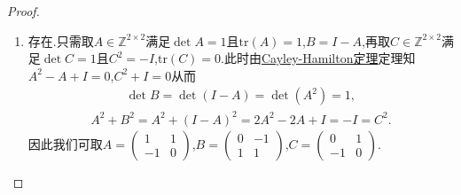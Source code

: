 \documentclass[../../main.tex]{subfiles}
\begin{document}
\begin{proof}
\begin{enumerate}[(1)]
\item 存在.只需取$A\in \mathbb{Z}^{2 \times 2}$满足$\det A = 1$且$\mathrm{tr}(A) = 1$,$B = I - A$,再取$C\in \mathbb{Z}^{2 \times 2}$满足$\det C = 1$且$C^2 = -I$,$\mathrm{tr}(C) = 0$.此时由\hyperref[theorem:Cayley-Hamilton定理]{Cayley-Hamilton定理}定理知$A^2 - A + I = 0$,$C^2 + I = 0$从而
\begin{align*}
\det B = \det(I - A) = \det(A^2) = 1,
\end{align*}
\begin{align*}
A^2 + B^2 = A^2 + (I - A)^2 = 2A^2 - 2A + I = -I = C^2.
\end{align*}
因此我们可取$A = \begin{pmatrix} 1 & 1 \\ -1 & 0 \end{pmatrix}$,$B = \begin{pmatrix} 0 & -1 \\ 1 & 1 \end{pmatrix}$,$C = \begin{pmatrix} 0 & 1 \\ -1 & 0 \end{pmatrix}$.
\end{enumerate}

\end{proof}
\end{document}
